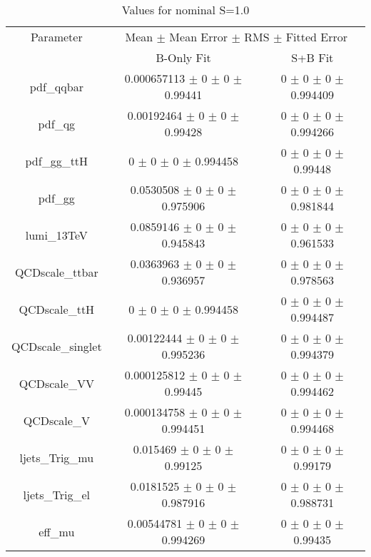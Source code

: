 \begin{table}
\centering
\caption{Values for nominal S=1.0}
\begin{tabular}{ccc}
\toprule
Parameter 	& \multicolumn{2}{c}{Mean $\pm$ Mean Error $\pm$ RMS $\pm$ Fitted Error}\\
 	& B-Only Fit & S+B Fit\\
\midrule
pdf\_qqbar 	& \num{0.000657113} $\pm$ \num{0} $\pm$ \num{0} $\pm$ \num{0.99441} 	& \num{0} $\pm$ \num{0} $\pm$ \num{0} $\pm$ \num{0.994409}\\
pdf\_qg 	& \num{0.00192464} $\pm$ \num{0} $\pm$ \num{0} $\pm$ \num{0.99428} 	& \num{0} $\pm$ \num{0} $\pm$ \num{0} $\pm$ \num{0.994266}\\
pdf\_gg\_ttH 	& \num{0} $\pm$ \num{0} $\pm$ \num{0} $\pm$ \num{0.994458} 	& \num{0} $\pm$ \num{0} $\pm$ \num{0} $\pm$ \num{0.99448}\\
pdf\_gg 	& \num{0.0530508} $\pm$ \num{0} $\pm$ \num{0} $\pm$ \num{0.975906} 	& \num{0} $\pm$ \num{0} $\pm$ \num{0} $\pm$ \num{0.981844}\\
lumi\_13TeV 	& \num{0.0859146} $\pm$ \num{0} $\pm$ \num{0} $\pm$ \num{0.945843} 	& \num{0} $\pm$ \num{0} $\pm$ \num{0} $\pm$ \num{0.961533}\\
QCDscale\_ttbar 	& \num{0.0363963} $\pm$ \num{0} $\pm$ \num{0} $\pm$ \num{0.936957} 	& \num{0} $\pm$ \num{0} $\pm$ \num{0} $\pm$ \num{0.978563}\\
QCDscale\_ttH 	& \num{0} $\pm$ \num{0} $\pm$ \num{0} $\pm$ \num{0.994458} 	& \num{0} $\pm$ \num{0} $\pm$ \num{0} $\pm$ \num{0.994487}\\
QCDscale\_singlet 	& \num{0.00122444} $\pm$ \num{0} $\pm$ \num{0} $\pm$ \num{0.995236} 	& \num{0} $\pm$ \num{0} $\pm$ \num{0} $\pm$ \num{0.994379}\\
QCDscale\_VV 	& \num{0.000125812} $\pm$ \num{0} $\pm$ \num{0} $\pm$ \num{0.99445} 	& \num{0} $\pm$ \num{0} $\pm$ \num{0} $\pm$ \num{0.994462}\\
QCDscale\_V 	& \num{0.000134758} $\pm$ \num{0} $\pm$ \num{0} $\pm$ \num{0.994451} 	& \num{0} $\pm$ \num{0} $\pm$ \num{0} $\pm$ \num{0.994468}\\
ljets\_Trig\_mu 	& \num{0.015469} $\pm$ \num{0} $\pm$ \num{0} $\pm$ \num{0.99125} 	& \num{0} $\pm$ \num{0} $\pm$ \num{0} $\pm$ \num{0.99179}\\
ljets\_Trig\_el 	& \num{0.0181525} $\pm$ \num{0} $\pm$ \num{0} $\pm$ \num{0.987916} 	& \num{0} $\pm$ \num{0} $\pm$ \num{0} $\pm$ \num{0.988731}\\
eff\_mu 	& \num{0.00544781} $\pm$ \num{0} $\pm$ \num{0} $\pm$ \num{0.994269} 	& \num{0} $\pm$ \num{0} $\pm$ \num{0} $\pm$ \num{0.99435}\\

\end{tabular}
\end{table}
